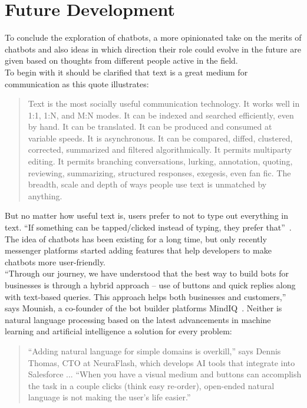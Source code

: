 \chapter{Future Development}

To conclude the exploration of chatbots, a more opinionated take on the merits of chatbots
and also ideas in which direction their role could evolve in the future are given
based on thoughts from different people active in the field.
\\

To begin with it should be clarified that text is a great medium for communication as this quote illustrates:

\begin{quote}
Text is the most socially useful communication technology. It works well in 1:1, 1:N, and M:N modes. It can be indexed and searched efficiently, even by hand. It can be translated. It can be produced and consumed at variable speeds. It is asynchronous. It can be compared, diffed, clustered, corrected, summarized and filtered algorithmically. It permits multiparty editing. It permits branching conversations, lurking, annotation, quoting, reviewing, summarizing, structured responses, exegesis, even fan fic. The breadth, scale and depth of ways people use text is unmatched by anything.~\cite{futuretext}
\end{quote}

But no matter how useful text is, users prefer to not to type out everything in text.
``If something can be tapped/clicked instead of typing, they prefer that''~\cite{chatbotslife}.
\\
The idea of chatbots has been existing for a long time,
but only recently messenger platforms started adding features that help developers to make chatbots more user-friendly.
\\
``Through our journey, we have understood that the best way to build bots for businesses is through a hybrid approach – use of buttons and quick replies along with text-based queries. This approach helps both businesses and customers,'' says Mounish, a co-founder of the bot builder platforms MindIQ~\cite{techinasia}.
Neither is natural language processing based on the latest advancements in machine learning and artificial intelligence a solution for every problem:

\begin{quote}
“Adding natural language for simple domains is overkill,” says Dennis Thomas, CTO at NeuraFlash, which develops AI tools that integrate into Salesforce ... “When you have a visual medium and buttons can accomplish the task in a couple clicks (think easy re-order), open-ended natural language is not making the user’s life easier.”~\cite{neednlp}
\end{quote}

